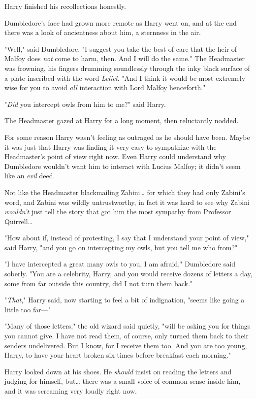 Harry finished his recollections honestly.

Dumbledore's face had grown more remote as Harry went on, and at the end there
was a look of ancientness about him, a sternness in the air.

"Well," said Dumbledore. "I suggest you take the best of care that the heir of
Malfoy does \emph{not} come to harm, then. And I will do the same." The
Headmaster was frowning, his fingers drumming soundlessly through the inky
black surface of a plate inscribed with the word \emph{Leliel.} "And I think it
would be most extremely wise for you to avoid \emph{all} interaction with Lord
Malfoy henceforth."

"\emph{Did} you intercept owls from him to me?" said Harry.

The Headmaster gazed at Harry for a long moment, then reluctantly nodded.

For some reason Harry wasn't feeling as outraged as he should have been. Maybe
it was just that Harry was finding it very easy to sympathize with the
Headmaster's point of view right now. Even Harry could understand why
Dumbledore wouldn't want him to interact with Lucius Malfoy; it didn't seem
like an \emph{evil} deed.

Not like the Headmaster blackmailing Zabini{\ldots} for which they had only
Zabini's word, and Zabini was wildly untrustworthy, in fact it was hard to see
why Zabini \emph{wouldn't} just tell the story that got him the most sympathy
from Professor Quirrell{\ldots}

"How about if, instead of protesting, I say that I understand your point of
view," said Harry, "and you go on intercepting my owls, but you tell me who
from?"

"I have intercepted a great many owls to you, I am afraid," Dumbledore said
soberly. "You are a celebrity, Harry, and you would receive dozens of letters a
day, some from far outside this country, did I not turn them back."

"\emph{That}," Harry said, now starting to feel a bit of indignation, "seems
like going a little too far---"

"Many of those letters," the old wizard said quietly, "will be asking you for
things you cannot give. I have not read them, of course, only turned them back
to their senders undelivered. But I know, for I receive them too. And you are
too young, Harry, to have your heart broken six times before breakfast each
morning."

Harry looked down at his shoes. He \emph{should} insist on reading the letters
and judging for himself, but{\ldots} there was a small voice of common sense
inside him, and it was screaming very loudly right now.

